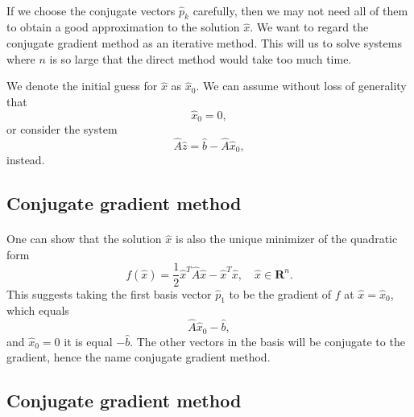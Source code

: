 \documentclass[%
oneside,                 %
final,                   %
10pt]{article}
\begin{document}
\paragraph{}

If we choose the conjugate vectors $\hat{p}_k$ carefully, 
then we may not need all of them to obtain a good approximation to the solution 
$\hat{x}$. 
We want to regard the conjugate gradient method as an iterative method. 
This will us to solve systems where $n$ is so large that the direct 
method would take too much time.

We denote the initial guess for $\hat{x}$ as $\hat{x}_0$. 
We can assume without loss of generality that
\begin{equation*}
\hat{x}_0=0,
\end{equation*}
or consider the system
\begin{equation*}
\hat{A}\hat{z} = \hat{b}-\hat{A}\hat{x}_0,
\end{equation*}
instead.



\subsection*{Conjugate gradient method}

\paragraph{}
One can show that the solution $\hat{x}$ is also the unique minimizer of the quadratic form
\begin{equation*}
  f(\hat{x}) = \frac{1}{2}\hat{x}^T\hat{A}\hat{x} - \hat{x}^T \hat{x} , \quad \hat{x}\in\mathbf{R}^n. 
\end{equation*}
This suggests taking the first basis vector $\hat{p}_1$ 
to be the gradient of $f$ at $\hat{x}=\hat{x}_0$, 
which equals
\begin{equation*}
\hat{A}\hat{x}_0-\hat{b},
\end{equation*}
and 
$\hat{x}_0=0$ it is equal $-\hat{b}$.
The other vectors in the basis will be conjugate to the gradient, 
hence the name conjugate gradient method.



\subsection*{Conjugate gradient method}
\end{document}

